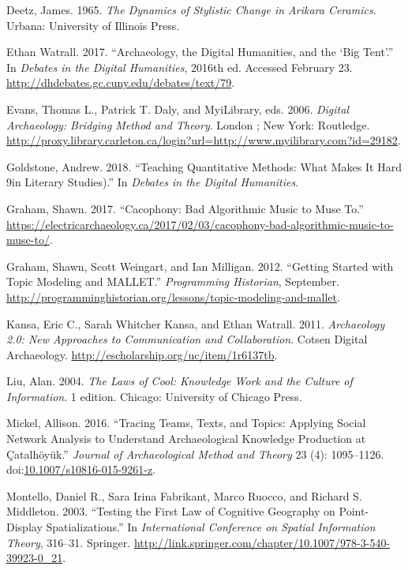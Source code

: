 \documentclass[english,]{book}
\begin{document}
\hypertarget{ref-deetz_dynamics_1965}{}
Deetz, James. 1965. \emph{The Dynamics of Stylistic Change in Arikara
Ceramics}. Urbana: University of Illinois Press.

\hypertarget{ref-watrall_archaeology_2017}{}
Ethan Watrall. 2017. ``Archaeology, the Digital Humanities, and the `Big
Tent'.'' In \emph{Debates in the Digital Humanities}, 2016th ed.
Accessed February 23.
\url{http://dhdebates.gc.cuny.edu/debates/text/79}.

\hypertarget{ref-evans_digital_2006}{}
Evans, Thomas L., Patrick T. Daly, and MyiLibrary, eds. 2006.
\emph{Digital Archaeology: Bridging Method and Theory}. London ; New
York: Routledge.
\url{http://proxy.library.carleton.ca/login?url=http://www.myilibrary.com?id=29182}.

\hypertarget{ref-goldstone_teaching_2018}{}
Goldstone, Andrew. 2018. ``Teaching Quantitative Methods: What Makes It
Hard 9in Literary Studies).'' In \emph{Debates in the Digital
Humanities}.

\hypertarget{ref-graham_cacophony_2017}{}
Graham, Shawn. 2017. ``Cacophony: Bad Algorithmic Music to Muse To.''
\url{https://electricarchaeology.ca/2017/02/03/cacophony-bad-algorithmic-music-to-muse-to/}.

\hypertarget{ref-graham_getting_2012}{}
Graham, Shawn, Scott Weingart, and Ian Milligan. 2012. ``Getting Started
with Topic Modeling and MALLET.'' \emph{Programming Historian},
September.
\url{http://programminghistorian.org/lessons/topic-modeling-and-mallet}.

\hypertarget{ref-kansa_archaeology_2011}{}
Kansa, Eric C., Sarah Whitcher Kansa, and Ethan Watrall. 2011.
\emph{Archaeology 2.0: New Approaches to Communication and
Collaboration}. Cotsen Digital Archaeology.
\url{http://escholarship.org/uc/item/1r6137tb}.

\hypertarget{ref-liu_laws_2004}{}
Liu, Alan. 2004. \emph{The Laws of Cool: Knowledge Work and the Culture
of Information}. 1 edition. Chicago: University of Chicago Press.

\hypertarget{ref-mickel_tracing_2016}{}
Mickel, Allison. 2016. ``Tracing Teams, Texts, and Topics: Applying
Social Network Analysis to Understand Archaeological Knowledge
Production at Çatalhöyük.'' \emph{Journal of Archaeological Method and
Theory} 23 (4): 1095--1126.
doi:\href{https://doi.org/10.1007/s10816-015-9261-z}{10.1007/s10816-015-9261-z}.

\hypertarget{ref-montello_testing_2003}{}
Montello, Daniel R., Sara Irina Fabrikant, Marco Ruocco, and Richard S.
Middleton. 2003. ``Testing the First Law of Cognitive Geography on
Point-Display Spatializations.'' In \emph{International Conference on
Spatial Information Theory}, 316--31. Springer.
\url{http://link.springer.com/chapter/10.1007/978-3-540-39923-0_21}.
\end{document}
